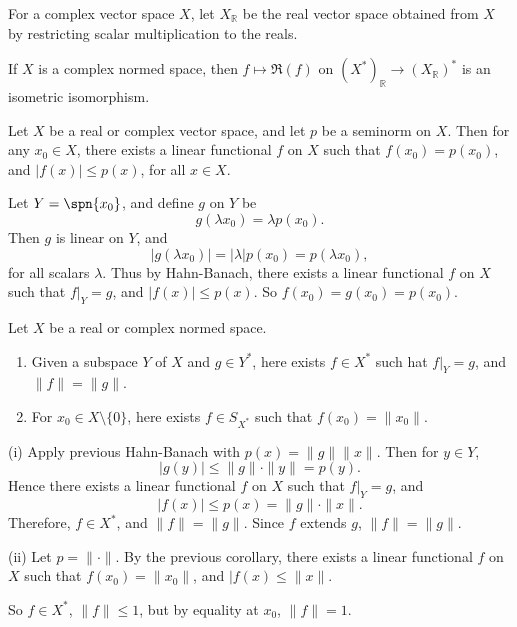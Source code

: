 \documentclass[12pt]{article}
\begin{document}
\begin{remark}
	For a complex vector space $X$, let $X_{\mathbb{R}}$ be the real vector space obtained from $X$ by restricting scalar multiplication to the reals.

	If $X$ is a complex normed space, then $f \mapsto \Re(f)$ on $(X^\ast)_{\mathbb{R}} \to (X_{\mathbb{R}})^\ast$ is an isometric isomorphism.
\end{remark}

\begin{corollary}
	Let $X$ be a real or complex vector space, and let $p$ be a seminorm on $X$. Then for any $x_0 \in X$, there exists a linear functional $f$ on $X$ such that $f(x_0) = p(x_0)$, and $|f(x)| \leq p(x)$, for all $x \in X$.
\end{corollary}

\begin{proofbox}
	Let $Y = \spn\{x_0\}$, and define $g$ on $Y$ be
	\[
	g(\lambda x_0) = \lambda p(x_0).
	\]
	Then $g$ is linear on $Y$, and
	\[
	|g(\lambda x_0)| = |\lambda|p(x_0) = p(\lambda x_0),
	\]
	for all scalars $\lambda$. Thus by Hahn-Banach, there exists a linear functional $f$ on $X$ such that $f|_Y = g$, and $|f(x)| \leq p(x)$. So $f(x_0) = g(x_0) = p(x_0)$.
\end{proofbox}

\begin{theorem}
	Let $X$ be a real or complex normed space.
	\begin{enumerate}[\normalfont(i)]
		\item Given a subspace $Y$ of $X$ and $g \in Y^\ast$, here exists $f \in X^\ast$ such hat $f|_Y = g$, and $\|f\| = \|g\|$.
		\item For $x_0 \in X \setminus \{0\}$, here exists $f \in S_{X^\ast}$ such that $f(x_0) = \|x_0\|$.
	\end{enumerate}
\end{theorem}

\begin{proofbox}
	

	(i) Apply previous Hahn-Banach with $p(x) = \|g\| \|x\|$. Then for $y \in Y$,
	\[
	|g(y)| \leq \|g\| \cdot \|y\| = p(y).
	\]
	Hence there exists a linear functional $f$ on $X$ such that $f|_Y = g$, and
	\[
	|f(x)| \leq p(x) = \|g\| \cdot \|x\|.
	\]
	Therefore, $f \in X^\ast$, and $\|f\| = \|g\|$. Since $f$ extends $g$, $\|f\| = \|g\|$.

	(ii) Let $p = \|\cdot\|$. By the previous corollary, there exists a linear functional $f$ on $X$ such that $f(x_0) = \|x_0\|$, and $|f(x) \leq \|x\|$.

	So $f \in X^\ast$, $\|f\| \leq 1$, but by equality at $x_0$, $\|f\| = 1$.
\end{proofbox}
\end{document}
